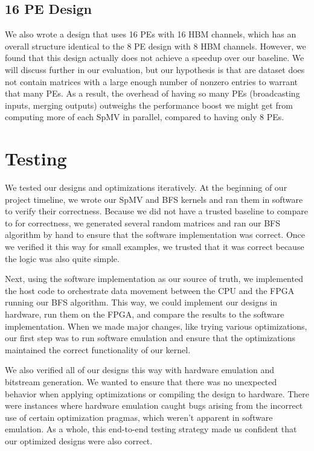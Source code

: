 \documentclass[10pt]{article}
\begin{document}
\subsection{16 PE Design}
\noindent We also wrote a design that uses 16 PEs with 16 HBM channels, which has an overall structure
identical to the 8 PE design with 8 HBM channels. However, we found that this design actually does
not achieve a speedup over our baseline. We will discuss further in our
evaluation, but our hypothesis is that are dataset does not contain matrices
with a large enough number of nonzero entries to warrant that many PEs. As a
result, the overhead of having so many PEs (broadcasting inputs, merging
outputs) outweighs the performance boost we might get from computing more of
each SpMV in parallel, compared to having only 8 PEs.

\section{Testing}
\noindent We tested our designs and optimizations iteratively. At the beginning of our project timeline, we 
wrote our SpMV and BFS kernels and ran them in software to verify their correctness. Because we did not
have a trusted baseline to compare to for correctness, we generated several random matrices and 
ran our BFS algorithm by hand to ensure that the software implementation was correct. Once we verified
it this way for small examples, we trusted that it was correct because the logic was also quite simple. \newline

\noindent Next, using the software implementation as our source of truth, we implemented the host code to orchestrate
data movement between the CPU and the FPGA running our BFS algorithm. This way, we could implement our designs
in hardware, run them on the FPGA, and compare the results to the software implementation. When we made
major changes, like trying various optimizations, our first step was to run software emulation and ensure
that the optimizations maintained the correct functionality of our kernel. \newline 

\noindent We also verified all of our designs this way with hardware emulation and bitstream generation. We wanted
to ensure that there was no unexpected behavior when applying optimizations or compiling the design
to hardware. There were instances where hardware emulation caught bugs arising from the incorrect use
of certain optimization pragmas, which weren't apparent in software emulation. As a whole, this end-to-end
testing strategy made us confident that our optimized designs were also correct.
\end{document}
